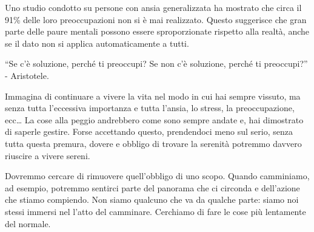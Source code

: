 \documentclass[12pt]{book} %
\begin{document}
Uno studio condotto su persone con ansia generalizzata ha mostrato che circa il 91\% delle loro preoccupazioni non si è mai realizzato. Questo suggerisce che gran parte delle paure mentali possono essere sproporzionate rispetto alla realtà, anche se il dato non si applica automaticamente a tutti.

“Se c'è soluzione, perché ti preoccupi? Se non c'è soluzione, perché ti preoccupi?” - Aristotele.

Immagina di continuare a vivere la vita nel modo in cui hai sempre vissuto, ma senza tutta l'eccessiva importanza e tutta l'ansia, lo stress, la preoccupazione, ecc… La cose alla peggio andrebbero come sono sempre andate e, hai dimostrato di saperle gestire. Forse accettando questo, prendendoci meno sul serio, senza tutta questa premura, dovere e obbligo di trovare la serenità potremmo davvero riuscire a vivere sereni.

Dovremmo cercare di rimuovere quell'obbligo di uno scopo. Quando camminiamo, ad esempio, potremmo sentirci parte del panorama che ci circonda e dell'azione che stiamo compiendo.
Non siamo qualcuno che va da qualche parte: siamo noi stessi immersi nel l'atto del camminare. 
Cerchiamo di fare le cose più lentamente del normale.
\end{document}
